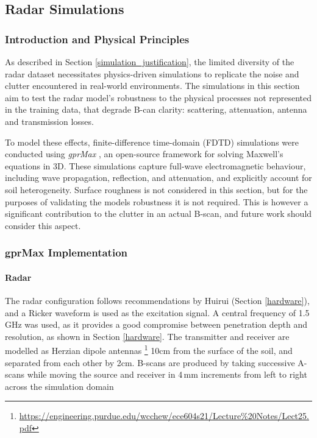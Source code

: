 \subsection{Radar Simulations} \label{compvis_radarsims}

    \subsubsection{Introduction and Physical Principles} \label{rory_radar_principles}
    
        \noindent As described in Section \ref{simulation_justification}, the limited diversity of the radar dataset necessitates physics-driven simulations to replicate the noise and clutter encountered in real-world environments. The simulations in this section aim to test the radar model's robustness to the physical processes not represented in the training data, that degrade B-can clarity: scattering, attenuation, antenna and transmission losses.
        
        \noindent To model these effects, finite-difference time-domain (FDTD) simulations were conducted using \textit{gprMax} \cite{warren2016gprmax}, an open-source framework for solving Maxwell’s equations in 3D. These simulations capture full-wave electromagnetic behaviour, including wave propagation, reflection, and attenuation, and explicitly account for soil heterogeneity. Surface roughness is not considered in this section, but for the purposes of validating the models robustness it is not required. This is however a significant contribution to the clutter in an actual B-scan, and future work should consider this aspect.
     
    
    \subsubsection{gprMax Implementation}

        \paragraph{Radar}
        
             \noindent The radar configuration follows recommendations by Huirui (Section \ref{hardware}), and a Ricker waveform is used as the excitation signal. A central frequency of 1.5\,GHz was used, as it provides a good compromise between penetration depth and resolution, as shown in Section \ref{hardware}. The transmitter and receiver are modelled as Herzian dipole antennas \footnote{\url{https://engineering.purdue.edu/wcchew/ece604s21/Lecture\%20Notes/Lect25.pdf}} 10cm from the surface of the soil, and separated from each other by 2cm. B-scans are produced by taking successive A-scans while moving the source and receiver in 4\,mm increments from left to right across the simulation domain
    

